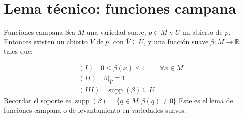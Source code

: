 \section{Lema técnico: funciones campana}
\begin{booklemma}{Funciones campana}
Sea $M$ una variedad suave, $p\in M$ y $U$ un abierto de $p$. Entonces existen un abierto $V$ de $p$, con $\overline{V}\subseteq U$, y una función suave $\beta:M\to\mathbb{R}$ tales que:

\[
\begin{aligned} & (I)\quad0\leq \beta(x)\leq 1\qquad\forall x\in M \\ & (II) \quad\beta|_{\overline{V}}\equiv 1\\&(III)\quad\operatorname{supp}(\beta)\subseteq U\end{aligned}
\]
Recordar el soporte es $\operatorname{supp}(\beta)=\{ q\in M:\beta(q)\neq0 \}$ Este es el lema de funciones campana o de levantamiento en variedades suaves.

\end{booklemma}
